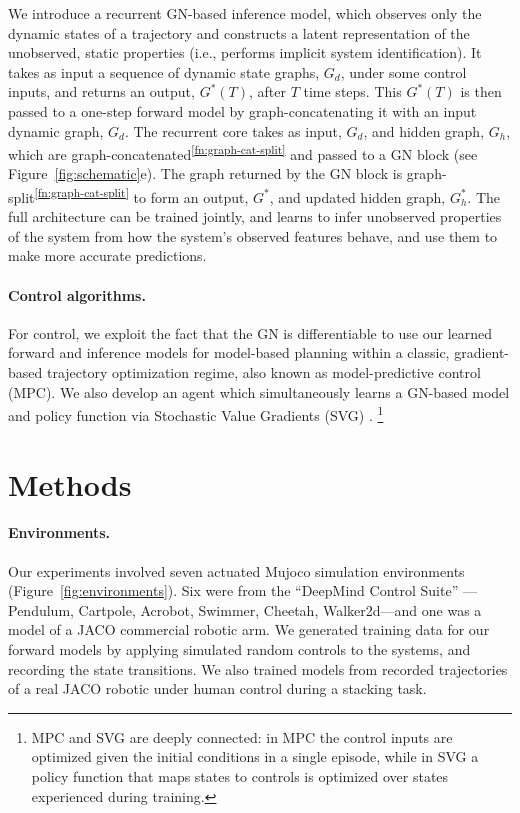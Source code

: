 \documentclass{article}
\begin{document}
We introduce a recurrent GN-based inference model, which observes only the dynamic states of a trajectory and constructs a latent representation of the unobserved, static properties (i.e., performs implicit system identification). %
It takes as input a sequence of dynamic state graphs, $G_d$, under some control inputs, and returns an output, $G^*(T)$, after $T$ time steps. This $G^*(T)$ is then passed to a one-step forward model by graph-concatenating it with an input dynamic graph, $G_d$. 
%
The recurrent core takes as input, $G_d$, and hidden graph, $G_h$, which are graph-concatenated\textsuperscript{\ref{fn:graph-cat-split}} and passed to a GN block (see Figure~\ref{fig:schematic}e). The graph returned by the GN block is graph-split\textsuperscript{\ref{fn:graph-cat-split}} to form an output, $G^*$, and updated hidden graph, $G_h^*$.
%
The full architecture can be trained jointly, and learns to infer unobserved properties of the system from how the system's observed features behave, and use them to make more accurate predictions. 

\paragraph{Control algorithms.}
For control, we exploit the fact that the GN is differentiable to use our learned forward and inference models for model-based planning within a classic, gradient-based trajectory optimization regime, also known as model-predictive control (MPC). We also develop an agent which simultaneously learns a GN-based model and policy function via Stochastic Value Gradients (SVG) \cite{heess2015learning}.
%
\footnote{MPC and SVG are deeply connected: in MPC the control inputs are optimized given the initial conditions in a single episode, while in SVG a policy function that maps states to controls is optimized over states experienced during training.}

\section{Methods}
\label{sec:methods}
\paragraph{Environments.}
Our experiments involved seven actuated Mujoco simulation environments (Figure~\ref{fig:environments}). Six were from the ``DeepMind Control Suite'' \cite{tassa2018deepmind}---Pendulum, Cartpole, Acrobot, Swimmer, Cheetah, Walker2d---and one was a model of a JACO commercial robotic arm. We generated training data for our forward models by applying simulated random controls to the systems, and recording the state transitions. We also trained models from recorded trajectories of a real JACO robotic under human control during a stacking task.
\end{document}
